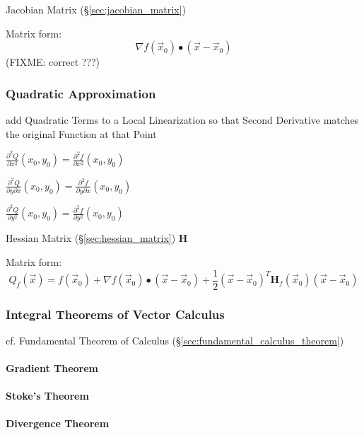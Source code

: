 \fist Jacobian Matrix (\S\ref{sec:jacobian_matrix})

Matrix form:
\[
  \nabla f(\vec{x}_0) \bullet (\vec{x}-\vec{x}_0)
\]
(FIXME: correct ???)



\subsubsection{Quadratic Approximation}\label{sec:quadratic_approximation}

add Quadratic Terms to a Local Linearization so that Second Derivative matches
the original Function at that Point

$\frac{\partial^2{Q}}{\partial{x^2}}(x_0,y_0) =
  \frac{\partial^2{f}}{\partial{x^2}}(x_0,y_0)$

$\frac{\partial^2{Q}}{\partial{y}\partial{x}}(x_0,y_0) =
  \frac{\partial^2{f}}{\partial{y}\partial{x}}(x_0,y_0)$

$\frac{\partial^2{Q}}{\partial{y^2}}(x_0,y_0) =
  \frac{\partial^2{f}}{\partial{y^2}}(x_0,y_0)$

\fist Hessian Matrix (\S\ref{sec:hessian_matrix}) $\mathbf{H}$

Matrix form:
\[
  Q_f(\vec{x}) = f(\vec{x}_0) + \nabla{f(\vec{x}_0)}\bullet (\vec{x}-\vec{x}_0)
  + \frac{1}{2}(\vec{x}-\vec{x}_0)^T\mathbf{H}_f(\vec{x}_0)(\vec{x}-\vec{x}_0)
\]



\subsubsection{Integral Theorems of Vector Calculus}
\label{sec:integral_theorems}

cf. Fundamental Theorem of Calculus (\S\ref{sec:fundamental_calculus_theorem})



\paragraph{Gradient Theorem}\label{sec:gradient_theorem}\hfill

\paragraph{Stoke's Theorem}\label{sec:stokes_theorem}\hfill

\paragraph{Divergence Theorem}\label{sec:divergence_theorem}\hfill

